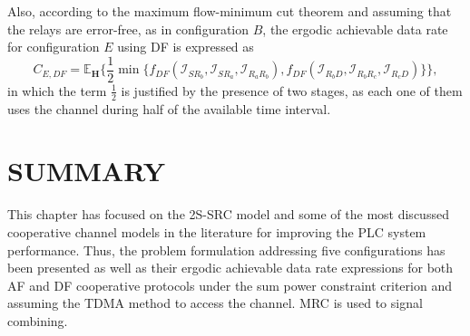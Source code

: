 Also, according to the maximum flow-minimum cut theorem and assuming that the relays are error-free, as in configuration $B$, the ergodic achievable data rate for configuration $E$ using \ac{DF} is expressed as
\begin{equation}
	C_{E,DF} = \mathbb{E}_{\mathbf{H}} \{ \frac{1}{2} \min\{f_{DF}(\mathcal{I}_{SR_{b}},\mathcal{I}_{SR_{a}},\mathcal{I}_{R_{a}R_{b}}),
	f_{DF}(\mathcal{I}_{R_{b}D},\mathcal{I}_{R_{b}R_{c}},\mathcal{I}_{R_{c}D})\}\},
\end{equation}
in which the term $ \frac{1}{2} $ is justified by the presence of two stages, as each one of them uses the channel during half of the available time interval.

\section{SUMMARY} \label{sec:SUM_2S_SRC}

This chapter has focused on the \ac{2S-SRC} model and some of the most discussed cooperative channel models in the literature for improving the \ac{PLC} system performance. Thus, the problem formulation addressing five configurations has been presented as well as their ergodic achievable data rate expressions for both \ac{AF} and \ac{DF} cooperative protocols under the sum power constraint criterion and assuming the \ac{TDMA} method to access the channel. \ac{MRC} is used to signal combining.


